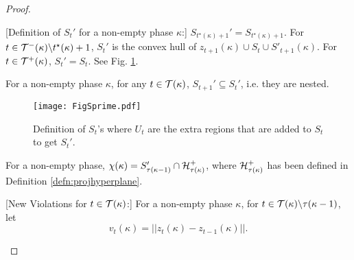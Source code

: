 \begin{proof}
\begin{definition}\label{}
[Definition of $S_t'$ for a non-empty phase $\kappa$:]  $S_{t^\star(\kappa)+1}' = S_{t^\star(\kappa)+1}$.
For $t \in \mathcal{T}^-(\kappa) \backslash t^\star(\kappa)+1$, 
$S_t'$ is the convex hull of $z_{t+1}(\kappa) \cup S_t \cup S'_{t+1}(\kappa)$. For $t\in \mathcal{T}^+(\kappa)$, 
$S_t' =S_t$.
See Fig. \ref{fig:defSprime}.
\end{definition}

\begin{lemma}\label{lem:nestedprime} For a non-empty phase $\kappa$, for any $t \in \mathcal{T}(\kappa)$, $S_{t+1}' \subseteq S_t' $, i.e. they are nested.
\end{lemma}
\begin{figure}
\texttt{[image: FigSprime.pdf]}
\caption{Definition of $S_t$'s where $U_t$ are the extra regions that are added to $S_t$ to get $S_t'$.}
\label{fig:defSprime}
\end{figure}

\begin{definition} For a non-empty phase, 
 $\chi(\kappa) = S_{\tau(\kappa-1)}'  \cap \mathcal{H}_{\tau(\kappa)}^+$, where $\mathcal{H}_{\tau(\kappa)}^+$ has been defined in Definition \ref{defn:projhyperplane}.

\end{definition}

\begin{definition}\label{}
[New Violations for  $t\in \mathcal{T}(\kappa)$:] 
For a non-empty phase $\kappa$, for $t\in \mathcal{T}(\kappa) \backslash \tau(\kappa-1)$, let 
$$v_t(\kappa) = ||z_t(\kappa)-z_{t-1}(\kappa)||.$$
\end{definition}

%



\end{proof}
